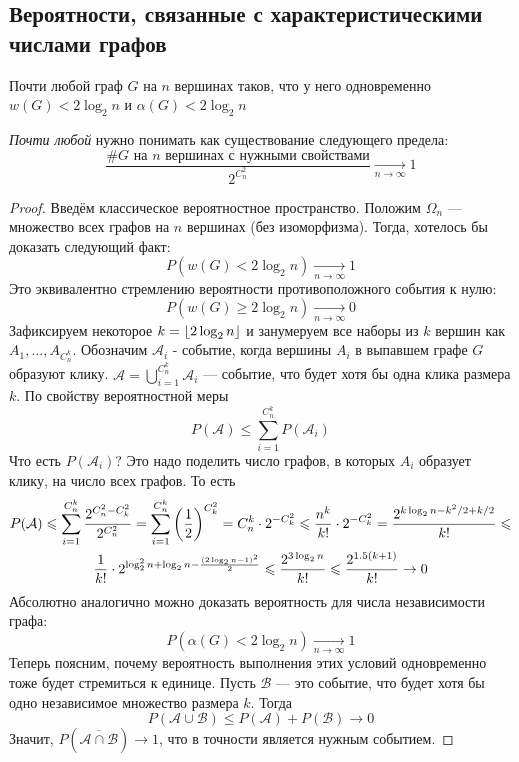 \subsection{Вероятности, связанные с характеристическими числами графов}

\begin{theorem}
	Почти любой граф $G$ на $n$ вершинах таков, что у него одновременно $w(G) < 2\log_2 n$ и $\alpha(G) < 2\log_2 n$
\end{theorem}

\begin{note}
	\textit{Почти любой} нужно понимать как существование следующего предела:
	\[
		\frac{\text{\#$G$ на $n$ вершинах с нужными свойствами}}{2^{C_n^2}} \xrightarrow[n \to \infty]{} 1
	\]
\end{note}

\begin{proof}
	Введём классическое вероятностное пространство. Положим $\Omega_n$ --- множество всех графов на $n$ вершинах (без изоморфизма). Тогда, хотелось бы доказать следующий факт:
	\[
		P(w(G) < 2\log_2 n) \xrightarrow[n \to \infty]{} 1
	\]
	Это эквивалентно стремлению вероятности противоположного события к нулю:
	\[
		P(w(G) \ge 2\log_2 n) \xrightarrow[n \to \infty]{} 0
	\]
	Зафиксируем некоторое $k = \left\lfloor 2\log_2 n \right\rfloor$ и занумеруем все наборы из $k$ вершин как $A_1, \ldots, A_{C_n^k}$. Обозначим $\mathcal{A}_i$ - событие, когда вершины $A_i$ в выпавшем графе $G$ образуют клику. $\mathcal{A} = \bigcup_{i = 1}^{C_n^k} \mathcal{A}_i$  --- событие, что будет хотя бы одна клика размера $k$. По свойству вероятностной меры
	\[
		P(\mathcal{A}) \le \sum_{i = 1}^{C_n^k} P(\mathcal{A}_i)
	\]
	Что есть $P(\mathcal{A}_i)$? Это надо поделить число графов, в которых $A_i$ образует клику, на число всех графов. То есть
	\begin{multline*}
		P(\mathcal{A}) \leqslant \sum_{i = 1}^{C_n^k} \frac{2^{C_n^2 - C_k^2}}{2^{C_n^2}} = \sum_{i = 1}^{C_n^k} \left(\frac{1}{2}\right)^{C_k^2} = C_n^k \cdot 2^{-C_k^2} \leqslant \frac{n^k}{k!} \cdot 2^{-C_k^2} = \frac{2^{k \log_2 n - k^2 / 2 + k / 2}}{k!} \leqslant
		\\
		\frac{1}{k!} \cdot 2^{\log^2_2 n + \log_2 n - \frac{(2\log_2 n - 1)^2}{2}} \leqslant \frac{2^{3\log_2 n}}{k!} \leqslant \frac{2^{1.5(k + 1)}}{k!} \to 0
	\end{multline*}
	Абсолютно аналогично можно доказать вероятность для числа независимости графа:
	\[
		P(\alpha(G) < 2\log_2 n) \xrightarrow[n \to \infty]{} 1
	\]
	Теперь поясним, почему вероятность выполнения этих условий одновременно тоже будет стремиться к единице. Пусть $\mathcal{B}$ --- это событие, что будет хотя бы одно независимое множество размера $k$. Тогда
	\[
		P(\mathcal{A} \cup \mathcal{B}) \le P(\mathcal{A}) + P(\mathcal{B}) \to 0
	\]
	Значит, $P(\overline{\mathcal{A} \cap \mathcal{B}}) \to 1$, что в точности является нужным событием.
\end{proof}

